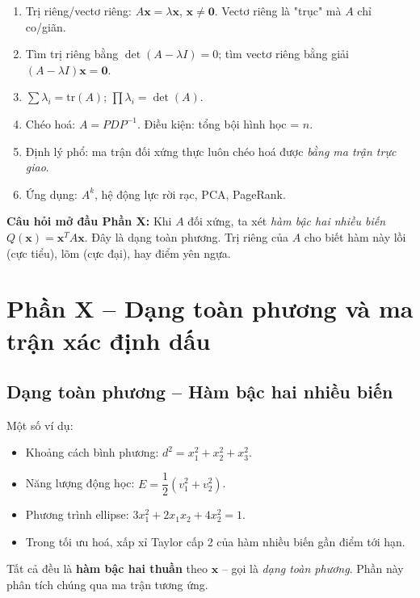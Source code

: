 \documentclass[12pt,a4paper]{article}
\begin{document}
\begin{tongket}[title={Tổng kết Phần IX}]
\begin{enumerate}
  \item Trị riêng/vectơ riêng: $A\mathbf{x} = \lambda \mathbf{x}$, $\mathbf{x} \ne \mathbf{0}$. Vectơ riêng là "trục" mà $A$ chỉ co/giãn.
  \item Tìm trị riêng bằng $\det(A - \lambda I) = 0$; tìm vectơ riêng bằng giải $(A - \lambda I)\mathbf{x} = \mathbf{0}$.
  \item $\sum \lambda_i = \mathrm{tr}(A)$; $\prod \lambda_i = \det(A)$.
  \item Chéo hoá: $A = PDP^{-1}$. Điều kiện: tổng bội hình học = $n$.
  \item Định lý phổ: ma trận đối xứng thực luôn chéo hoá được \emph{bằng ma trận trực giao}.
  \item Ứng dụng: $A^k$, hệ động lực rời rạc, PCA, PageRank.
\end{enumerate}

\textbf{Câu hỏi mở đầu Phần X:} Khi $A$ đối xứng, ta xét \emph{hàm bậc hai nhiều biến} $Q(\mathbf{x}) = \mathbf{x}^T A \mathbf{x}$. Đây là dạng toàn phương. Trị riêng của $A$ cho biết hàm này lồi (cực tiểu), lõm (cực đại), hay điểm yên ngựa.
\end{tongket}

\newpage

\section{Phần X -- Dạng toàn phương và ma trận xác định dấu}

\subsection{Dạng toàn phương -- Hàm bậc hai nhiều biến}

\begin{dongco}
Một số ví dụ:
\begin{itemize}
  \item Khoảng cách bình phương: $d^2 = x_1^2 + x_2^2 + x_3^2$.
  \item Năng lượng động học: $E = \dfrac{1}{2}(v_1^2 + v_2^2)$.
  \item Phương trình ellipse: $3x_1^2 + 2x_1 x_2 + 4x_2^2 = 1$.
  \item Trong tối ưu hoá, xấp xỉ Taylor cấp 2 của hàm nhiều biến gần điểm tới hạn.
\end{itemize}
Tất cả đều là \textbf{hàm bậc hai thuần} theo $\mathbf{x}$ -- gọi là \emph{dạng toàn phương}. Phần này phân tích chúng qua ma trận tương ứng.
\end{dongco}
\end{document}

